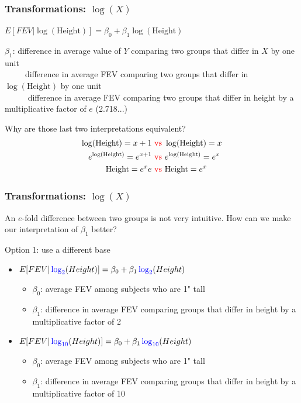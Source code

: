 \documentclass[12pt, 
hyperref={colorlinks=true, linkcolor=blue, urlcolor=cyan},dvipsnames]{beamer}
\begin{document}
\begin{frame}
\frametitle{Transformations: $\log(X)$}
\begin{center} $E[FEV|\log(\text{Height})] = \beta_0 + \beta_1 \log(\text{Height})$ \end{center}

$\beta_1$: difference in average value of $Y$ comparing two groups that differ in $X$ by one unit\\ \pause
\ \ \ \ \ difference in average FEV comparing two groups that differ in $\log(\text{Height})$ by one unit\\ \pause
\ \ \ \ \ \color{blue} difference in average FEV comparing two groups that differ in height by a multiplicative factor of $e$ (2.718...) \color{black} \pause

Why are those last two interpretations equivalent?
\begin{align*}
\log(\text{Height}) = x + 1 &\color{red}\text{ vs }\color{black} \log(\text{Height}) = x \\
e^{\log(\text{Height})} = e^{x+1} &\color{red}\text{ vs }\color{black} e^{\log(\text{Height})} = e^x \\
\text{Height} = e^{x}e &\color{red}\text{ vs }\color{black} \text{Height} = e^{x}
\end{align*}
\end{frame}

\begin{frame}
\frametitle{Transformations: $\log(X)$}
An $e$-fold difference between two groups is not very intuitive. How can we make our interpretation of $\beta_1$ better?

Option 1: use a different base\pause
\begin{itemize}
\item $E[FEV|\color{blue}\log_2\color{black}(Height)] = \beta_0 + \beta_1 \color{blue}\log_2\color{black}(Height)$
	\begin{itemize}
	\item $\beta_0$: average FEV among subjects who are 1" tall
	\item $\beta_1$: difference in average FEV comparing groups that differ in height by a \color{blue} multiplicative factor of 2\color{black}
	\end{itemize} \pause
\item $E[FEV|\color{blue}\log_{10}\color{black}(Height)] = \beta_0 + \beta_1 \color{blue}\log_{10}\color{black}(Height)$
	\begin{itemize}
	\item $\beta_0$: average FEV among subjects who are 1" tall
	\item $\beta_1$: difference in average FEV comparing groups that differ in height by a \color{blue}multiplicative factor of 10\color{black}
	\end{itemize}
\end{itemize}
\end{frame}
\end{document}
